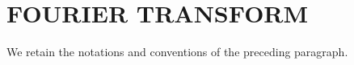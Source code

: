 \section{FOURIER TRANSFORM}

We retain the notations and conventions of the preceding paragraph.
\relax{}
